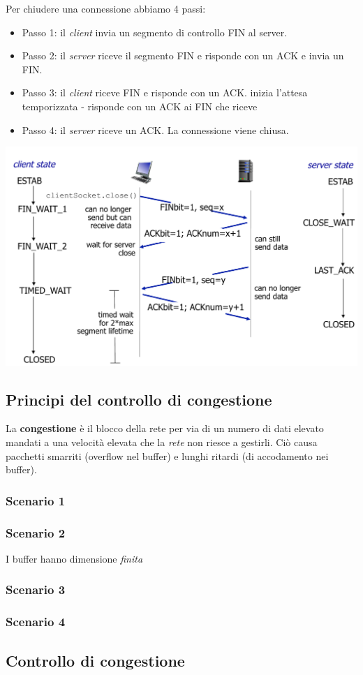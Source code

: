 Per chiudere una connessione abbiamo 4 passi: 
\begin{itemize}
  \item Passo 1: il \textit{client} invia un segmento di controllo FIN al server.
\item Passo 2: il \textit{server} riceve il segmento FIN e risponde con un ACK e invia un FIN.
\item Passo 3: il \textit{client} riceve FIN e risponde con un ACK. inizia l’attesa temporizzata - risponde con un ACK ai FIN che riceve 
\item Passo 4: il \textit{server} riceve un ACK. La connessione viene chiusa.
\end{itemize}
\includegraphics[width=\textwidth]{./img/chiusuraconnessionetcp.png}  

\subsection{Principi del controllo di congestione}
La \textbf{congestione} è il blocco della rete per via di un numero di dati elevato mandati a una velocità elevata che la \textit{rete} non riesce a gestirli. 
Ciò causa pacchetti smarriti (overflow nel buffer) e lunghi ritardi (di accodamento nei buffer). 

\subsubsection*{Scenario 1}

\subsubsection*{Scenario 2}
I buffer hanno dimensione \textit{finita}

\subsubsection*{Scenario 3}

\subsubsection*{Scenario 4}

\subsection{Controllo di congestione}


